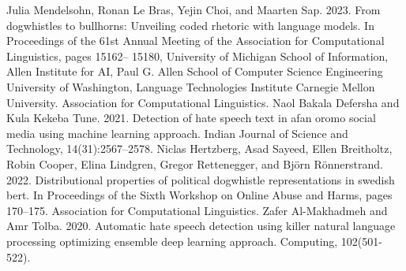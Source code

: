 \documentclass[11pt,a4paper]{article}
\begin{document}
\begin{thebibliography}{9}
Julia Mendelsohn, Ronan Le Bras, Yejin Choi, and Maarten Sap. 2023. From dogwhistles to bullhorns: Unveiling coded rhetoric with language models. In Proceedings of the 61st Annual Meeting of the Association for Computational Linguistics, pages 15162– 15180, University of Michigan School of Information, Allen Institute for AI, Paul G. Allen School of Computer Science Engineering University of Washington, Language Technologies Institute Carnegie Mellon University. Association for Computational Linguistics.
Naol Bakala Defersha and Kula Kekeba Tune. 2021. Detection of hate speech text in afan oromo social media using machine learning approach. Indian Journal of Science and Technology, 14(31):2567–2578.
Niclas Hertzberg, Asad Sayeed, Ellen Breitholtz, Robin Cooper, Elina Lindgren, Gregor Rettenegger, and Björn Rönnerstrand. 2022. Distributional properties of political dogwhistle representations in swedish bert. In Proceedings of the Sixth Workshop on Online Abuse and Harms, pages 170–175. Association for Computational Linguistics.
Zafer Al-Makhadmeh and Amr Tolba. 2020. Automatic hate speech detection using killer natural language processing optimizing ensemble deep learning approach. Computing, 102(501-522).
\end{thebibliography}
\end{document}
